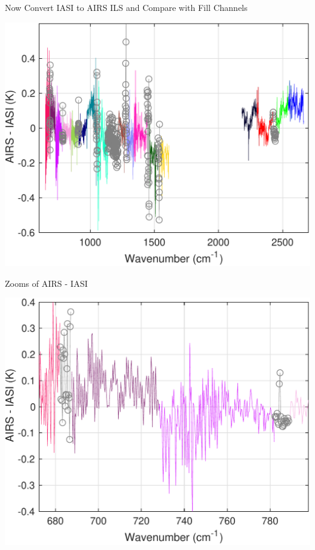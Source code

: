 \documentclass[10pt,t]{beamer}
\begin{document}
\begin{frame}[label={sec:org6c3a7f3}]{\small Now Convert IASI to AIRS ILS and Compare with Fill Channels}
\begin{center}
\includegraphics[width=0.8\linewidth]{./Figs/Pdf/sno_airs_m_iasi_with_fill.pdf}
\end{center}
\end{frame}
\begin{frame}[label={sec:org4f75b9a}]{Zooms of AIRS - IASI}
\begin{center}
\includegraphics[width=.9\linewidth]{./Figs/Pdf/sno_airs_m_iasi_with_fill_lwzoom.pdf}
\end{center}
\end{frame}
\end{document}
